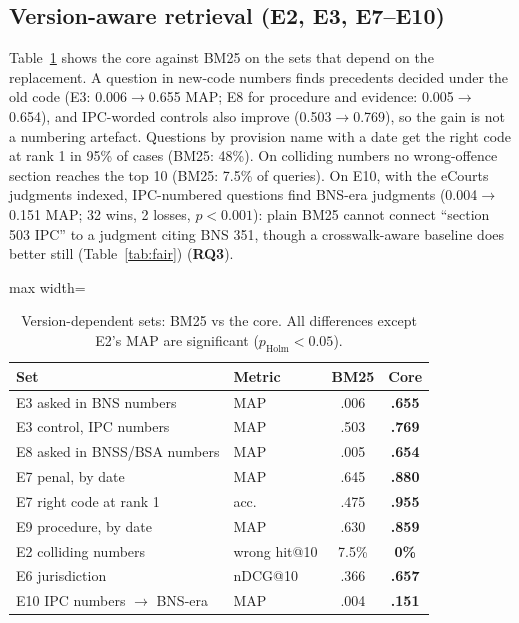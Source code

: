 \documentclass[sigconf,nonacm]{acmart}
\newcommand{\ph}{p_{\text{Holm}}}
\begin{document}
\subsection{Version-aware retrieval (E2, E3, E7--E10)}

Table~\ref{tab:version} shows the core against BM25 on the sets that depend on the replacement. A
question in new-code numbers finds precedents decided under the old code (E3: 0.006$\to$0.655 MAP;
E8 for procedure and evidence: 0.005$\to$0.654), and IPC-worded controls also improve (0.503$\to$0.769),
so the gain is not a numbering artefact. Questions by provision name with a date get the right code
at rank 1 in 95\% of cases (BM25: 48\%). On colliding numbers no wrong-offence section reaches the
top 10 (BM25: 7.5\% of queries). On E10, with the eCourts judgments indexed, IPC-numbered questions
find BNS-era judgments (0.004$\to$0.151 MAP; 32 wins, 2 losses, $p<0.001$): plain BM25 cannot
connect ``section 503 IPC'' to a judgment citing BNS 351, though a crosswalk-aware baseline does better still
(Table~\ref{tab:fair}) (\textbf{RQ3}).

\begin{table}[t]
\centering\small
\caption{Version-dependent sets: BM25 vs the core. All differences except E2's MAP are significant
($\ph<0.05$).}
\label{tab:version}
\begin{adjustbox}{max width=\linewidth}
\begin{tabular}{llcc}
\toprule
Set & Metric & BM25 & Core \\
\midrule
E3 asked in BNS numbers & MAP & .006 & \textbf{.655} \\
E3 control, IPC numbers & MAP & .503 & \textbf{.769} \\
E8 asked in BNSS/BSA numbers & MAP & .005 & \textbf{.654} \\
E7 penal, by date & MAP & .645 & \textbf{.880} \\
E7 right code at rank 1 & acc. & .475 & \textbf{.955} \\
E9 procedure, by date & MAP & .630 & \textbf{.859} \\
E2 colliding numbers & wrong hit@10 & 7.5\% & \textbf{0\%} \\
E6 jurisdiction & nDCG@10 & .366 & \textbf{.657} \\
E10 IPC numbers $\to$ BNS-era & MAP & .004 & \textbf{.151} \\
\bottomrule
\end{tabular}
\end{adjustbox}
\end{table}
\end{document}
